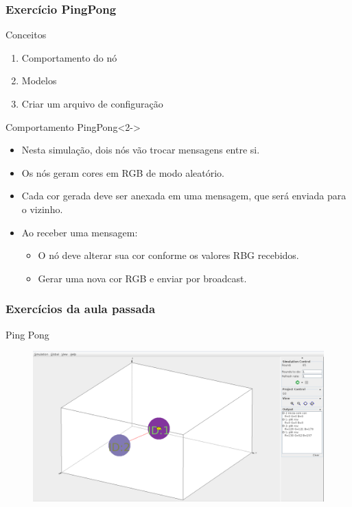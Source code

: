 \documentclass{beamer}
\begin{document}
\begin{frame}\frametitle{Exercício PingPong}

	\begin{block}{Conceitos}
		\begin{enumerate}
			\item Comportamento do nó
			\item Modelos
			\item Criar um arquivo de configuração
		\end{enumerate}
	\end{block}

	\begin{exampleblock}{Comportamento PingPong}<2->
	\begin{itemize}
		\item Nesta simulação, dois nós vão trocar mensagens entre si.
		\item Os nós geram cores em RGB de modo aleatório.
		\item Cada cor gerada deve ser anexada em uma mensagem, que será enviada para o vizinho.
		\item Ao receber uma mensagem:
		\begin{itemize}
			\item O nó deve alterar sua cor conforme os valores RBG recebidos.
			\item Gerar uma nova cor RGB e enviar por broadcast.
		\end{itemize}
	\end{itemize}
	\end{exampleblock}

\end{frame}

\begin{frame}\frametitle{Exercícios da aula passada}

	\begin{exampleblock}{Ping Pong}
		\begin{figure}[t]
			\includegraphics[width=1\linewidth]{img/pingpong.png}
		\end{figure}
	\end{exampleblock}
\end{frame}
\end{document}
